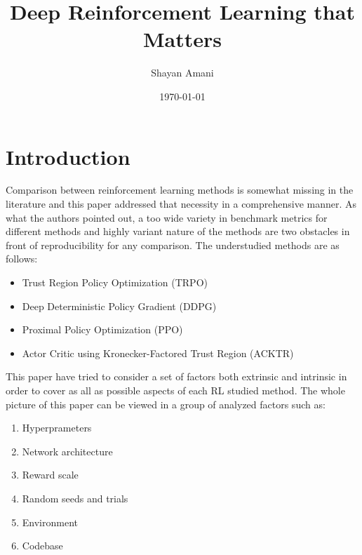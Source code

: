 \documentclass[a4paper,12pt]{article}
\title{Deep Reinforcement Learning that Matters}
\author{Shayan Amani}
\date{\today}
\begin{document}
\maketitle

\section{Introduction}
Comparison between reinforcement learning methods is somewhat missing in the literature and this paper addressed that necessity in a comprehensive manner. As what the authors pointed out, a too wide variety in benchmark metrics for different methods and highly variant nature of the methods are two obstacles in front of reproducibility for any comparison. The understudied methods are as follows:
\begin{itemize}
    \item Trust Region Policy Optimization (TRPO)
    \item Deep Deterministic Policy Gradient (DDPG)
    \item Proximal Policy Optimization (PPO)
    \item Actor Critic using Kronecker-Factored Trust Region (ACKTR)
\end{itemize}

This paper have tried to consider a set of factors both extrinsic and intrinsic in order to cover as all as possible aspects of each RL studied method. The whole picture of this paper can be viewed in a group of analyzed factors such as:
\begin{enumerate}
    \item Hyperprameters 
    \item Network architecture
    \item Reward scale
    \item Random seeds and trials
    \item Environment
    \item Codebase
\end{enumerate}
\end{document}
